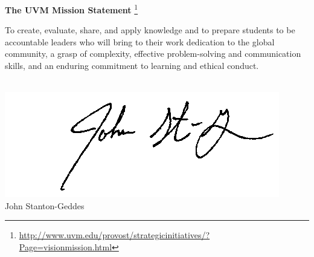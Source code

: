 \documentclass[letterpaper]{article}
\begin{document}
\thispagestyle{first}


\textbf{The UVM Mission Statement} \footnote{ \url{http://www.uvm.edu/provost/strategicinitiatives/?Page=visionmission.html} }



To create, evaluate, share, and apply knowledge and to prepare 
students to be accountable leaders who will bring to their work 
dedication to the global community, a grasp of complexity, 
effective problem-solving and communication skills, and an 
enduring commitment to learning and ethical conduct.

 \\
\includegraphics[scale=1]{JSG_signature.png}  \\
John Stanton-Geddes
\end{document}
